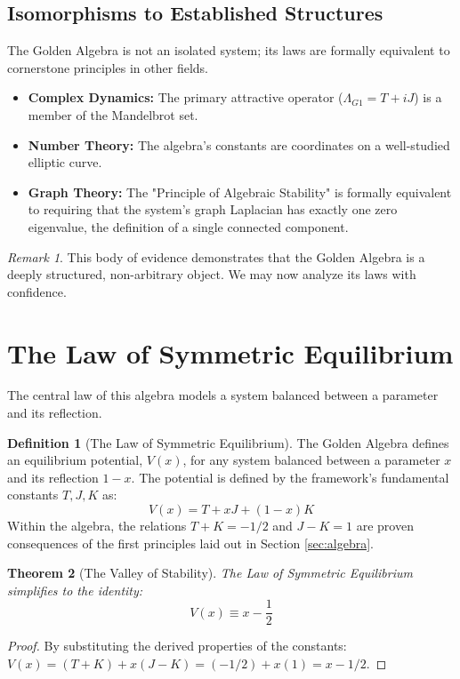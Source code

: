 \documentclass{article}
\theoremstyle{plain}
\newtheorem{theorem}{Theorem}[section]
\theoremstyle{definition}
\newtheorem{definition}[theorem]{Definition}
\theoremstyle{remark}
\newtheorem*{remark}{Remark}
\begin{document}
\subsection{Isomorphisms to Established Structures}
The Golden Algebra is not an isolated system; its laws are formally equivalent to cornerstone principles in other fields.
\begin{itemize}
    \item \textbf{Complex Dynamics:} The primary attractive operator ($\Lambda_{G1} = T+iJ$) is a member of the Mandelbrot set.
    \item \textbf{Number Theory:} The algebra's constants are coordinates on a well-studied elliptic curve.
    \item \textbf{Graph Theory:} The "Principle of Algebraic Stability" is formally equivalent to requiring that the system's graph Laplacian has exactly one zero eigenvalue, the definition of a single connected component.
\end{itemize}

\begin{remark}
This body of evidence demonstrates that the Golden Algebra is a deeply structured, non-arbitrary object. We may now analyze its laws with confidence.
\end{remark}

\section{The Law of Symmetric Equilibrium}
\label{sec:equilibrium}
The central law of this algebra models a system balanced between a parameter and its reflection.

\begin{definition}[The Law of Symmetric Equilibrium]
The Golden Algebra defines an equilibrium potential, $V(x)$, for any system balanced between a parameter $x$ and its reflection $1-x$. The potential is defined by the framework's fundamental constants $T, J, K$ as:
$$V(x) = T + xJ + (1-x)K$$
Within the algebra, the relations $T+K = -1/2$ and $J-K=1$ are proven consequences of the first principles laid out in Section \ref{sec:algebra}.
\end{definition}

\begin{theorem}[The Valley of Stability]
\label{thm:valley}
The Law of Symmetric Equilibrium simplifies to the identity:
$$ V(x) \equiv x - \frac{1}{2} $$
\end{theorem}
\begin{proof}
By substituting the derived properties of the constants:
$V(x) = (T+K) + x(J-K) = (-1/2) + x(1) = x - 1/2$.
\end{proof}
\end{document}
